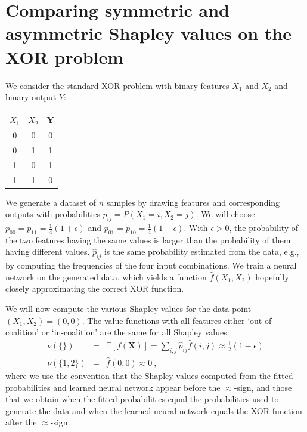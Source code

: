 \documentclass{article}
\newcommand{\vX}{\mathbf{X}}
\newcommand{\expectation}{\mathbb{E}}
\begin{document}
\section{Comparing symmetric and asymmetric Shapley values on the XOR problem}

We consider the standard XOR problem with binary features $X_1$ and $X_2$ and binary output $Y$:
\begin{center}
\begin{tabular}{cc|c}
	$X_1$ & $X_2$ & Y \\ \hline
	0     & 0     & 0 \\
	0     & 1     & 1 \\
	1     & 0     & 1 \\
	1     & 1     & 0
\end{tabular}
\end{center}
We generate a dataset of $n$ samples by drawing features and corresponding outputs with probabilities $p_{ij} = P(X_1=i,X_2=j)$. We will choose $p_{00} = p_{11} = \frac{1}{4} (1 + \epsilon)$ and $p_{01} = p_{10} = \frac{1}{4} (1 - \epsilon)$. With $\epsilon > 0$, the probability of the two features having the same values is larger than the probability of them having different values. $\hat{p}_{ij}$ is the same probability estimated from the data, e.g., by computing the frequencies of the four input combinations. We train a neural network on the generated data, which yields a function $\hat{f}(X_1,X_2)$ hopefully closely approximating the correct XOR function.

We will now compute the various Shapley values for the data point $(X_1,X_2) = (0,0)$. The value functions with all features either `out-of-coalition' or `in-coalition' are the same for all Shapley values:
\begin{eqnarray*}
\nu(\{\}) & = & \expectation\left[f(\vX)\right] = \sum_{i,j} \hat{p}_{ij} \hat{f}(i,j) \approx \frac{1}{2} (1 - \epsilon) \\
\nu(\{1,2\}) & = & \hat{f}(0,0) \approx 0 \: ,
\label{eq:marginal}
\end{eqnarray*}
where we use the convention that the Shapley values computed from the fitted probabilities and learned neural network appear before the $\approx$-sign, and those that we obtain when the fitted probabilities equal the probabilities used to generate the data and when the learned neural network equals the XOR function after the $\approx$-sign.
\end{document}

